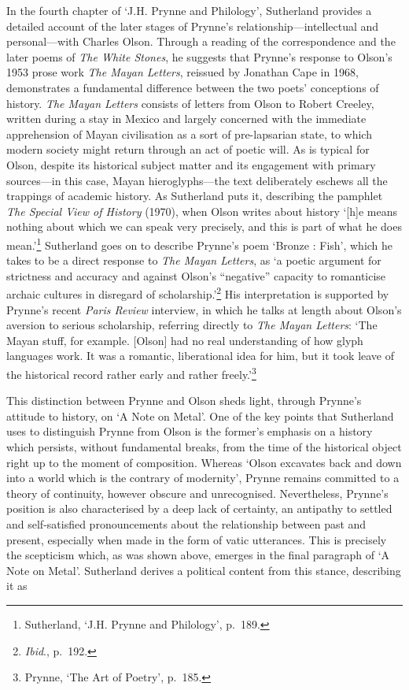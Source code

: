 \documentclass[]{article}
\begin{document}
In the fourth chapter of `J.H. Prynne and Philology', Sutherland
provides a detailed account of the later stages of Prynne's
relationship---intellectual and personal---with Charles Olson. Through a
reading of the correspondence and the later poems of \emph{The White
Stones}, he suggests that Prynne's response to Olson's 1953 prose work
\emph{The Mayan Letters}, reissued by Jonathan Cape in 1968,
demonstrates a fundamental difference between the two poets' conceptions
of history. \emph{The Mayan Letters} consists of letters from Olson to
Robert Creeley, written during a stay in Mexico and largely concerned
with the immediate apprehension of Mayan civilisation as a sort of
pre-lapsarian state, to which modern society might return through an act
of poetic will. As is typical for Olson, despite its historical subject
matter and its engagement with primary sources---in this case, Mayan
hieroglyphs---the text deliberately eschews all the trappings of
academic history. As Sutherland puts it, describing the pamphlet
\emph{The Special View of History} (1970), when Olson writes about
history `{[}h{]}e means nothing about which we can speak very precisely,
and this is part of what he does mean.'\footnote{Sutherland, `J.H.
  Prynne and Philology', p.~189.} Sutherland goes on to describe
Prynne's poem `Bronze : Fish', which he takes to be a direct response to
\emph{The Mayan Letters}, as `a poetic argument for strictness and
accuracy and against Olson's ``negative'' capacity to romanticise
archaic cultures in disregard of scholarship.'\footnote{\emph{Ibid}.,
  p.~192.} His interpretation is supported by Prynne's recent
\emph{Paris Review} interview, in which he talks at length about Olson's
aversion to serious scholarship, referring directly to \emph{The Mayan
Letters}: `The Mayan stuff, for example. {[}Olson{]} had no real
understanding of how glyph languages work. It was a romantic,
liberational idea for him, but it took leave of the historical record
rather early and rather freely.'\footnote{Prynne, `The Art of Poetry',
  p.~185.}

This distinction between Prynne and Olson sheds light, through Prynne's
attitude to history, on `A Note on Metal'. One of the key points that
Sutherland uses to distinguish Prynne from Olson is the former's
emphasis on a history which persists, without fundamental breaks, from
the time of the historical object right up to the moment of composition.
Whereas `Olson excavates back and down into a world which is the
contrary of modernity', Prynne remains committed to a theory of
continuity, however obscure and unrecognised. Nevertheless, Prynne's
position is also characterised by a deep lack of certainty, an antipathy
to settled and self-satisfied pronouncements about the relationship
between past and present, especially when made in the form of vatic
utterances. This is precisely the scepticism which, as was shown above,
emerges in the final paragraph of `A Note on Metal'. Sutherland derives
a political content from this stance, describing it as
\end{document}
